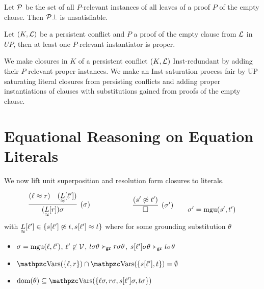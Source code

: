     \begin{lemma}
        Let \( \mathcal{P} \) be the set of all \(P\)-relevant instances
        of all leaves of a proof \( P \) of the empty clause.
        Then \( \mathcal{P} \bot \) is unsatisfiable.
    \end{lemma}

    \begin{corollary}
        Let \( (K, \mathcal{L}) \) be a persistent conflict
        and \( P \) a proof of the empty clause from \( \mathcal{L} \) in \( UP \),
        then at least one \(P\)-relevant instantiator is proper.
    \end{corollary}

    We make closures in \( K \)
    of a persistent conflict \( (K,\mathcal{L}) \)
    Inst-redundant by adding their \(P\)-relevant proper instances.
    We make an Inst-saturation process fair
    by UP-saturating literal closures from persisting conflicts
    and adding proper instantiations of clauses with substitutions
    gained from proofs of the empty clause.


    \section{Equational Reasoning on Equation Literals}\label{sec:reasoning:on:equational:literals}     
    
    We now lift unit superposition and resolution form closures to literals.

    \begin{definition}\label{def:unit:superposition:on:literals}
        \begin{gather*}
            \infer[(\sigma)]
            {(\underset{\mEQ}{L}[r])\sigma}
            {(\ell\mEQ r) & (\underset{\mEQ}{L}[\ell'])}
        \qquad\qquad\qquad
            \infer[(\sigma')]
            {\emptyclause}
            {(s'\mNE t')}
            \tag*{\(\sigma' = \mgu(s',t')\)}
        \end{gather*}
        with \( \underset{\approx}{L}[\ell'] \in \{ s[\ell']\not\approx t, s[\ell']\approx t \} \) where
        for some grounding substitution \( \theta \)
        \begin{itemize}
            \item
            \( \sigma = \operatorname{mgu}(\ell,\ell') \),
            \( \ell'\not\in\mathcal{V} \),
            \( l\sigma\theta \mathrel\succ_{\!\mathtt{gr}} r\sigma\theta \),
            \( s[\ell']\sigma\theta \mathrel\succ_{\!\mathtt{gr}} t\sigma\theta \)
            \item
            \( \var(\{\ell,r\}) \cap \var(\{ s[\ell'],t \}) = \emptyset \)
            \item
            \( \domain(\theta) \subseteq \var(\{ \ell\sigma,r\sigma,s[\ell']\sigma,t\sigma \}) \)
        \end{itemize}
    \end{definition}


